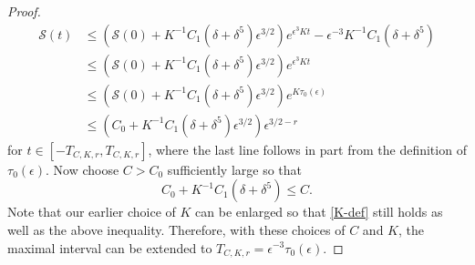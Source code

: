 \begin{proof}
\begin{equation}
	\begin{aligned}
		\mathcal S(t) &\leq \left( \mathcal S(0) + K^{-1} C_1 (\delta+\delta^5) \epsilon^{3/2} \right) e^{\epsilon^3 K t} - \epsilon^{-3} K^{-1} C_1 (\delta + \delta^5) \\
		&\leq \left( \mathcal S(0) + K^{-1} C_1 (\delta+\delta^5) \epsilon^{3/2} \right) e^{\epsilon^3 K t} \\
		&\leq \left( \mathcal S(0) + K^{-1} C_1 (\delta+\delta^5) \epsilon^{3/2} \right) e^{ K \tau_0(\epsilon)} \\
		&\leq \left( C_0 + K^{-1} C_1 (\delta+\delta^5) \epsilon^{3/2} \right) \epsilon^{3/2 -r}
	\end{aligned}
	\end{equation}
	for \(t \in [-T_{C,K,r}, T_{C,K,r}]\), where the last line follows in part from the definition of \(\tau_0(\epsilon)\). Now choose \(C> C_0\) sufficiently large so that 
	\begin{equation}
		C_0 + K^{-1} C_1(\delta + \delta^5) \leq C.
	\end{equation}
	Note that our earlier choice of \(K\) can be enlarged so that \cref{K-def} still holds as well as the above inequality. Therefore, with these choices of \(C\) and \(K\), the maximal interval can be extended to \(T_{C,K,r} = \epsilon^{-3} \tau_0(\epsilon) \). 
\end{proof}